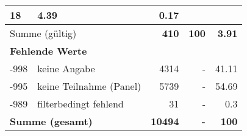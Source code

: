 \begin{longtable}{lXrrr}
       \num{18} &
       \num[round-mode=places,round-precision=2]{4,39} &
         \num[round-mode=places,round-precision=2]{0,17} \\
     \midrule
     \multicolumn{2}{l}{Summe (gültig)} &
       \textbf{\num{410}} &
     \textbf{100} &
       \textbf{\num[round-mode=places,round-precision=2]{3,91}} \\
     \multicolumn{5}{l}{\textbf{Fehlende Werte}}\\
       -998 &
       keine Angabe &
         \num{4314} &
        - &
         \num[round-mode=places,round-precision=2]{41,11} \\
       -995 &
       keine Teilnahme (Panel) &
         \num{5739} &
        - &
         \num[round-mode=places,round-precision=2]{54,69} \\
       -989 &
       filterbedingt fehlend &
         \num{31} &
        - &
         \num[round-mode=places,round-precision=2]{0,3} \\
     \midrule
     \multicolumn{2}{l}{\textbf{Summe (gesamt)}} &
          \textbf{\num{10494}} &
        \textbf{-} &
        \textbf{100} \\
     \bottomrule
     \end{longtable}
     

